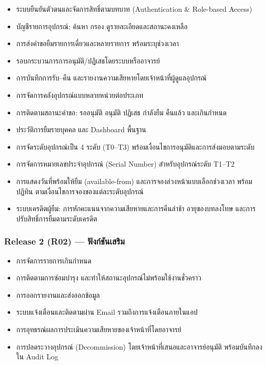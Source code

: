 \begin{itemize}
  \item ระบบยืนยันตัวตนและจัดการสิทธิ์ตามบทบาท (Authentication \& Role-based Access)
  \item บัญชีรายการอุปกรณ์: ค้นหา กรอง ดูรายละเอียดและสถานะคงเหลือ
  \item การส่งคำขอยืมรายการเดี่ยวและหลายรายการ พร้อมระบุช่วงเวลา
  \item รอบกระบวนการการอนุมัติ/ปฏิเสธโดยระบบหรืออาจารย์
  \item การบันทึกการรับ–คืน และรายงานความเสียหายโดยเจ้าหน้าที่ผู้ดูแลอุปกรณ์
  \item การจัดการคลังอุปกรณ์แบบหลายหน่วยต่อประเภท
  \item การติดตามสถานะคำขอ: รออนุมัติ อนุมัติ ปฏิเสธ กำลังยืม คืนแล้ว และเกินกำหนด
  \item ประวัติการยืมรายบุคคล และ Dashboard พื้นฐาน
  \item การจัดระดับอุปกรณ์เป็น 4 ระดับ (T0–T3) พร้อมเงื่อนไขการอนุมัติและการส่งมอบตามระดับ
  \item การจัดการหมายเลขประจำอุปกรณ์ (Serial Number) สำหรับอุปกรณ์ระดับ T1–T2
  \item การแสดงวันที่พร้อมให้ยืม (available-from) และการจองล่วงหน้าแบบเลือกช่วงเวลา พร้อมปฏิทิน ตามเงื่อนไขการจองของแต่ละระดับอุปกรณ์
  \item ระบบเครดิตผู้ยืม: การหักคะแนนจากความเสียหายและการคืนล่าช้า อายุของบทลงโทษ และการปรับสิทธิ์การยืมตามระดับเครดิต
\end{itemize}

\subsubsection*{Release 2 (R02) — ฟังก์ชันเสริม}

\begin{itemize}
  \item การจัดการรายการเกินกำหนด
  \item การติดตามการซ่อมบำรุง และทำให้สถานะอุปกรณ์ไม่พร้อมใช้งานชั่วคราว
  \item การออกรายงานและส่งออกข้อมูล
  \item ระบบแจ้งเตือนและติดตามผ่าน Email รวมถึงการแจ้งเตือนภายในแอป
  \item การอุทธรณ์ผลการประเมินความเสียหายของเจ้าหน้าที่โดยอาจารย์
  \item การปลดระวางอุปกรณ์ (Decommission) โดยเจ้าหน้าที่เสนอและอาจารย์อนุมัติ พร้อมบันทึกลงใน Audit Log
\end{itemize}

